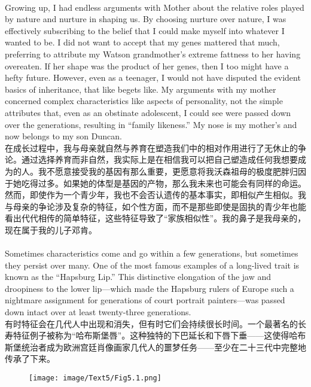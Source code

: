 \documentclass{article}
\begin{document}
\\
Growing up, I had endless arguments with Mother about the relative roles played by nature and nurture in shaping us. By choosing nurture over nature, I was effectively subscribing to the belief that I could make myself into whatever I wanted to be. I did not want to accept that my genes mattered that much, preferring to attribute my Watson grandmother’s extreme fattness to her having overeaten. If her shape was the product of her genes, then I too might have a hefty future. However, even as a teenager, I would not have disputed the evident basics of inheritance, that like begets like. My arguments with my mother concerned complex characteristics like aspects of personality, not the simple attributes that, even as an obstinate adolescent, I could see were passed down over the generations, resulting in “family likeness.” My nose is my mother’s and now belongs to my son Duncan.\\
在成长过程中，我与母亲就自然与养育在塑造我们中的相对作用进行了无休止的争论。通过选择养育而非自然，我实际上是在相信我可以把自己塑造成任何我想要成为的人。我不愿意接受我的基因有那么重要，更愿意将我沃森祖母的极度肥胖归因于她吃得过多。如果她的体型是基因的产物，那么我未来也可能会有同样的命运。然而，即使作为一个青少年，我也不会否认遗传的基本事实，即相似产生相似。我与母亲的争论涉及复杂的特征，如个性方面，而不是那些即使是固执的青少年也能看出代代相传的简单特征，这些特征导致了“家族相似性”。我的鼻子是我母亲的，现在属于我的儿子邓肯。\\

\\
Sometimes characteristics come and go within a few generations, but sometimes they persist over many. One of the most famous examples of a long-lived trait is known as the “Hapsburg Lip.” This distinctive elongation of the jaw and droopiness to the lower lip—which made the Hapsburg rulers of Europe such a nightmare assignment for generations of court portrait painters—was passed down intact over at least twenty-three generations.\\
有时特征会在几代人中出现和消失，但有时它们会持续很长时间。一个最著名的长寿特征例子被称为“哈布斯堡唇”。这种独特的下巴延长和下唇下垂——这使得哈布斯堡统治者成为欧洲宫廷肖像画家几代人的噩梦任务——至少在二十三代中完整地传承了下来。\\

\begin{figure}
    \centering
    \texttt{[image: image/Text5/Fig5.1.png]}
\end{figure}
\end{document}
